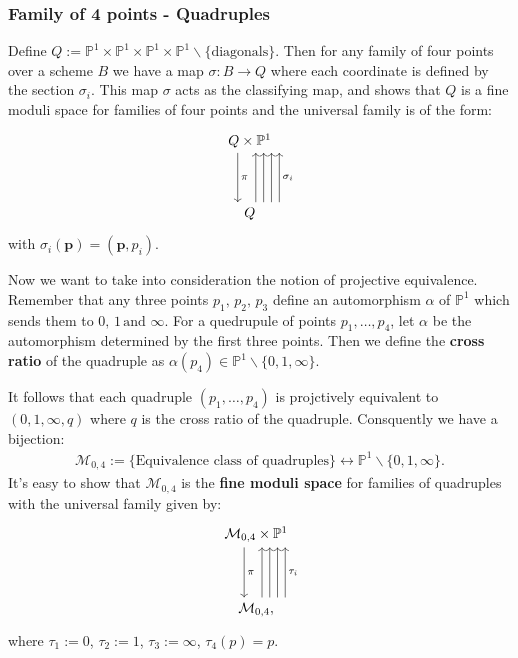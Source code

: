 \subsubsection{Family of 4 points - Quadruples}
Define $Q:= \mathbb{P}^{1} \times \mathbb{P}^{1} \times \mathbb{P}^{1} \times \mathbb{P}^{1} \backslash \{\text{diagonals}\}$. 
Then for any family of four points over a scheme $B$ we have a map $\sigma: B \to Q$ where each coordinate is defined by the section $\sigma_{i}$.
This map $\sigma$ acts as the classifying map, and shows that $Q$ is a fine moduli space for families of four points and the universal family is of the form:
\[
    \begin{tikzcd}
        Q \times \mathbb{P}^{1}\\
        \\
        Q
        \arrow["\pi",xshift = -2ex, from = 1-1, to = 3-1]
        \arrow[ xshift = 1ex,from = 3-1, to = 1-1]
        \arrow[ xshift = 2.3ex,from = 3-1, to = 1-1]
        \arrow[ xshift = 3.6ex,from = 3-1, to = 1-1]
        \arrow[ swap, "\sigma_{i}", xshift = 4.9ex,from = 3-1, to = 1-1]
    \end{tikzcd}
\]
with $\sigma_{i}(\textbf{p}) = (\textbf{p},p_{i})$.
\par Now we want to take into consideration the notion of projective equivalence. 
Remember that any three points $p_{1},\, p_{2}, \,p_{3}$ define an automorphism $\alpha$ of $\mathbb{P}^{1}$ which sends them to $0,\,1\,\text{and }\infty$.
For a quedrupule of points $p_1, \dots, p_4$, let $\alpha$ be the automorphism determined by the first three points. 
Then we define the \textbf{cross ratio} of the quadruple as $\alpha(p_{4}) \in \mathbb{P}^{1}\backslash\{0,1,\infty\}$.
\par It follows that each quadruple $(p_{1}, \dots, p_{4})$ is projctively equivalent to $(0,1,\infty,q)$ where $q$ is the cross ratio of the quadruple. Consquently we have a bijection:
\begin{align*}
    \mathcal{M}_{0,4} := \{\text{Equivalence class of quadruples}\} \leftrightarrow \mathbb{P}^{1}\backslash\{0,1,\infty\}.
\end{align*}
It's easy to show that $\mathcal{M}_{0,4}$ is the \textbf{fine moduli space} for families of quadruples with the universal family given by:
\[
    \begin{tikzcd}
        \mathcal{M}_{0,4} \times \mathbb{P}^{1}\\
        \\
        \mathcal{M}_{0,4},
        \arrow["\pi",xshift = -2ex, from = 1-1, to = 3-1]
        \arrow[ xshift = 1ex,from = 3-1, to = 1-1]
        \arrow[ xshift = 2.3ex,from = 3-1, to = 1-1]
        \arrow[ xshift = 3.6ex,from = 3-1, to = 1-1]
        \arrow[ swap, "\tau_{i}", xshift = 4.9ex,from = 3-1, to = 1-1]
    \end{tikzcd}
\]
where $\tau_1 :=0$, $\tau_2 :=1$, $\tau_3 := \infty$, $\tau_4(p) = p$.

